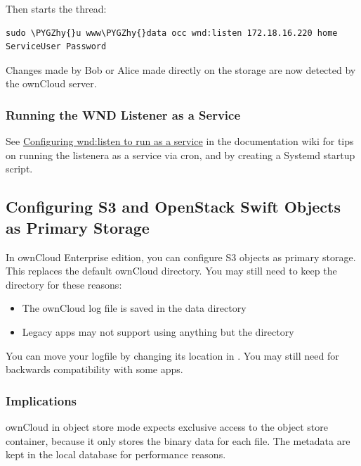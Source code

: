 \documentclass[letterpaper,10pt,english]{sphinxmanual}
\def\PYGZhy{\char`\-}
\begin{document}
Then starts the  thread:

\begin{Verbatim}[commandchars=\\\{\}]
sudo \PYGZhy{}u www\PYGZhy{}data occ wnd:listen 172.18.16.220 home ServiceUser Password
\end{Verbatim}

Changes made by Bob or Alice made directly on the storage are now detected by the ownCloud server.


\subsubsection{Running the WND Listener as a Service}
\label{enterprise_external_storage/windows-network-drive_configuration:running-the-wnd-listener-as-a-service}
See \href{https://github.com/owncloud/documentation/wiki/Configuring-wnd:listen-to-run-as-a-service}{Configuring wnd:listen to run as a service} in the documentation wiki for tips on running the listenera as a service via cron, and by creating a Systemd startup script.


\subsection{Configuring S3 and OpenStack Swift Objects as Primary Storage}
\label{enterprise_external_storage/s3_swift_as_primary_object_store_configuration:configuring-s3-and-openstack-swift-objects-as-primary-storage}\label{enterprise_external_storage/s3_swift_as_primary_object_store_configuration::doc}
In ownCloud Enterprise edition, you can configure S3 objects as primary
storage. This replaces the default ownCloud  directory. You may
still need to keep the  directory for these reasons:
\begin{itemize}
\item {} 
The ownCloud log file is saved in the data directory

\item {} 
Legacy apps may not support using anything but the  directory

\end{itemize}

You can move your logfile by changing its location in . You may still need
 for backwards compatibility with some apps.


\subsubsection{Implications}
\label{enterprise_external_storage/s3_swift_as_primary_object_store_configuration:implications}
ownCloud in object store mode expects exclusive access to the object store
container, because it only stores the binary data for each file. The metadata
are kept in the local database for performance reasons.
\end{document}
